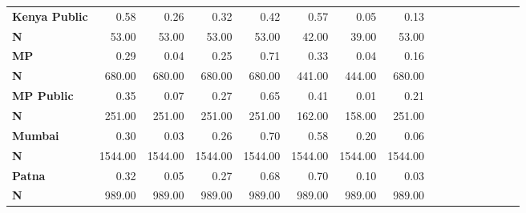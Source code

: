 \begin{tabular}{@{\extracolsep{5pt}}lrrrrrrrrrrrrrrr}
{\bf Kenya Public} & 0.58\phantom{***} & 0.26\phantom{***} & 0.32\phantom{***} & 0.42\phantom{***} & 0.57\phantom{***} & 0.05\phantom{***} & 0.13\phantom{***} \\
{\bf N} & 53.00\phantom{***} & 53.00\phantom{***} & 53.00\phantom{***} & 53.00\phantom{***} & 42.00\phantom{***} & 39.00\phantom{***} & 53.00\phantom{***} \\
{\bf MP} & 0.29\phantom{***} & 0.04\phantom{***} & 0.25\phantom{***} & 0.71\phantom{***} & 0.33\phantom{***} & 0.04\phantom{***} & 0.16\phantom{***} \\
{\bf N} & 680.00\phantom{***} & 680.00\phantom{***} & 680.00\phantom{***} & 680.00\phantom{***} & 441.00\phantom{***} & 444.00\phantom{***} & 680.00\phantom{***} \\
{\bf MP Public} & 0.35\phantom{***} & 0.07\phantom{***} & 0.27\phantom{***} & 0.65\phantom{***} & 0.41\phantom{***} & 0.01\phantom{***} & 0.21\phantom{***} \\
{\bf N} & 251.00\phantom{***} & 251.00\phantom{***} & 251.00\phantom{***} & 251.00\phantom{***} & 162.00\phantom{***} & 158.00\phantom{***} & 251.00\phantom{***} \\
{\bf Mumbai} & 0.30\phantom{***} & 0.03\phantom{***} & 0.26\phantom{***} & 0.70\phantom{***} & 0.58\phantom{***} & 0.20\phantom{***} & 0.06\phantom{***} \\
{\bf N} & 1544.00\phantom{***} & 1544.00\phantom{***} & 1544.00\phantom{***} & 1544.00\phantom{***} & 1544.00\phantom{***} & 1544.00\phantom{***} & 1544.00\phantom{***} \\
{\bf Patna} & 0.32\phantom{***} & 0.05\phantom{***} & 0.27\phantom{***} & 0.68\phantom{***} & 0.70\phantom{***} & 0.10\phantom{***} & 0.03\phantom{***} \\
{\bf N} & 989.00\phantom{***} & 989.00\phantom{***} & 989.00\phantom{***} & 989.00\phantom{***} & 989.00\phantom{***} & 989.00\phantom{***} & 989.00\phantom{***} \\
\hline
\end{tabular}
